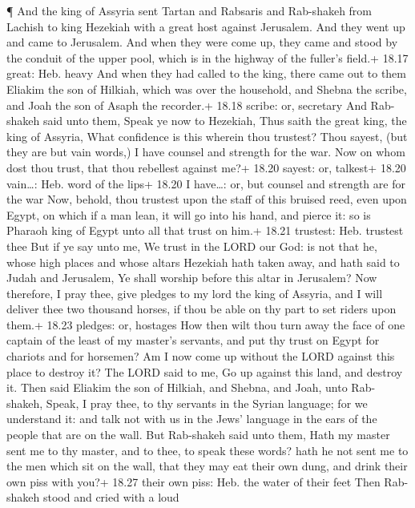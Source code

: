  ¶ And the king of Assyria sent Tartan and Rabsaris and
Rab-shakeh from Lachish to king Hezekiah with a great host against
Jerusalem. And they went up and came to Jerusalem. And when they were
come up, they came and stood by the conduit of the upper pool, which is
in the highway of the fuller's field.+ 18.17 great: Heb. heavy
 And when they had called to the king, there came out to
them Eliakim the son of Hilkiah, which was over the household, and
Shebna the scribe, and Joah the son of Asaph the recorder.+ 18.18
scribe: or, secretary  And Rab-shakeh said unto them, Speak
ye now to Hezekiah, Thus saith the great king, the king of Assyria, What
confidence is this wherein thou trustest?  Thou sayest,
(but they are but vain words,) I have counsel and strength for the war.
Now on whom dost thou trust, that thou rebellest against me?+ 18.20
sayest: or, talkest+ 18.20 vain\ldots: Heb. word of the lips+ 18.20 I
have\ldots: or, but counsel and strength are for the war 
Now, behold, thou trustest upon the staff of this bruised reed, even
upon Egypt, on which if a man lean, it will go into his hand, and pierce
it: so is Pharaoh king of Egypt unto all that trust on him.+ 18.21
trustest: Heb. trustest thee  But if ye say unto me, We
trust in the LORD our God: is not that he, whose high places and whose
altars Hezekiah hath taken away, and hath said to Judah and Jerusalem,
Ye shall worship before this altar in Jerusalem?  Now
therefore, I pray thee, give pledges to my lord the king of Assyria, and
I will deliver thee two thousand horses, if thou be able on thy part to
set riders upon them.+ 18.23 pledges: or, hostages  How
then wilt thou turn away the face of one captain of the least of my
master's servants, and put thy trust on Egypt for chariots and for
horsemen?  Am I now come up without the LORD against this
place to destroy it? The LORD said to me, Go up against this land, and
destroy it.  Then said Eliakim the son of Hilkiah, and
Shebna, and Joah, unto Rab-shakeh, Speak, I pray thee, to thy servants
in the Syrian language; for we understand it: and talk not with us in
the Jews' language in the ears of the people that are on the wall.
 But Rab-shakeh said unto them, Hath my master sent me to
thy master, and to thee, to speak these words? hath he not sent me to
the men which sit on the wall, that they may eat their own dung, and
drink their own piss with you?+ 18.27 their own piss: Heb. the water of
their feet  Then Rab-shakeh stood and cried with a loud
